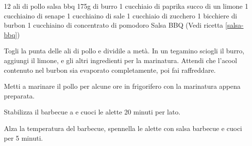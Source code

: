 \begin{ingreds}
	12 ali di pollo
	salsa bbq
\columnbreak
{}
	175g di burro
	1 cucchiaio di paprika
	succo di un limone
	1 cucchiaino di senape
	1 cucchiaino di sale
	1 cucchiaio di zucchero
	1 bicchiere di burbon
	1 cucchiaino di concentrato di pomodoro
	Salsa BBQ (Vedi ricetta \ref{salsa-bbq})
\end{ingreds}

\begin{method}
Togli la punta delle ali di pollo e dividile a metà. In un tegamino sciogli il burro, aggiungi il limone, e gli altri ingredienti per la marinatura. Attendi che l'acool contenuto nel burbon sia evaporato completamente, poi fai raffreddare.

Metti a marinare il pollo per alcune ore in frigorifero con la marinatura appena preparata.

Stabilizza il barbecue a  e cuoci le alette 20 minuti per lato.

Alza la temperatura del barbecue, spennella le alette con salsa barbecue e cuoci per 5 minuti.
\end {method}
